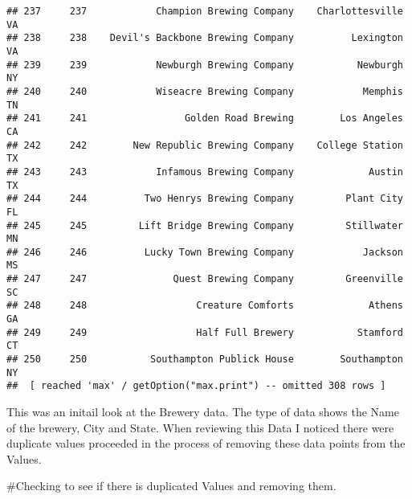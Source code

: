 \documentclass[
]{article}
\newenvironment{Shaded}{\begin{snugshade}}{\end{snugshade}}
\newcommand{\CommentTok}[1]{\textcolor[rgb]{0.56,0.35,0.01}{\textit{#1}}}
\newcommand{\KeywordTok}[1]{\textcolor[rgb]{0.13,0.29,0.53}{\textbf{#1}}}
\newcommand{\NormalTok}[1]{#1}
\newcommand{\OperatorTok}[1]{\textcolor[rgb]{0.81,0.36,0.00}{\textbf{#1}}}
\newcommand{\StringTok}[1]{\textcolor[rgb]{0.31,0.60,0.02}{#1}}
\begin{document}
\begin{verbatim}
## 237     237            Champion Brewing Company    Charlottesville    VA
## 238     238    Devil's Backbone Brewing Company          Lexington    VA
## 239     239            Newburgh Brewing Company           Newburgh    NY
## 240     240            Wiseacre Brewing Company            Memphis    TN
## 241     241                 Golden Road Brewing        Los Angeles    CA
## 242     242        New Republic Brewing Company    College Station    TX
## 243     243            Infamous Brewing Company             Austin    TX
## 244     244          Two Henrys Brewing Company         Plant City    FL
## 245     245         Lift Bridge Brewing Company         Stillwater    MN
## 246     246          Lucky Town Brewing Company            Jackson    MS
## 247     247               Quest Brewing Company         Greenville    SC
## 248     248                   Creature Comforts             Athens    GA
## 249     249                   Half Full Brewery           Stamford    CT
## 250     250           Southampton Publick House        Southampton    NY
##  [ reached 'max' / getOption("max.print") -- omitted 308 rows ]
\end{verbatim}

This was an initail look at the Brewery data. The type of data shows the
Name of the brewery, City and State. When reviewing this Data I noticed
there were duplicate values proceeded in the process of removing these
data points from the Values.

\#Checking to see if there is duplicated Values and removing them.

\begin{Shaded}
\end{Shaded}
\end{document}
